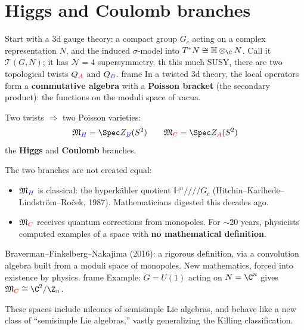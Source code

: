\documentclass[presentation]{beamer}
\newenvironment{block}
\newenvironment{frame}
\theoremstyle{remark}
\begin{document}
\section{Higgs and Coulomb branches}
\begin{frame}
  Start with a 3d gauge theory: a compact group $G_c$ acting on a
  complex representation $N$, and the induced $\sigma$-model into
  $T^*N\cong \mathbb{H}\otimes_{\C} N$.  Call it $\mathcal{T}(G,N)$;
  it has $\mathcal{N}=4$ supersymmetry.
  \begin{block}{}
    With this much SUSY, there are two topological twists
    $Q_{\color{red} A}$ and $Q_{\color{blue} B}$.
  \end{block}
  In a twisted 3d theory, the local operators form a {\bf commutative
    algebra} with a {\bf Poisson bracket} (the secondary product): the
  functions on the moduli space of vacua.
  \bigskip

  Two twists $\Rightarrow$ two Poisson varieties:
  \[\MH=\Spec Z_{\color{blue} B}(S^2) \qquad \MC=\Spec Z_{\color{red}
      A}(S^2)\]
  the {\bf \color{blue} Higgs} and {\bf \color{red} Coulomb} branches.
\end{frame}

\begin{frame}
  The two branches are not created equal:
  \begin{itemize}
  \item $\mathfrak{M}_{\color{blue}H}$ is classical: the hyperk\"ahler quotient
    $\mathbb{H}^n/\!/\!/\!/G_c$ (Hitchin--Karlhede--Lindstr\"om--Ro\v
    cek, 1987).  Mathematicians digested this decades ago.
  \item $\mathfrak{M}_{\color{red}C}$ receives quantum corrections from monopoles.  For
    $\sim$20 years, physicists computed examples of a space with {\bf
      no mathematical definition}.
  \end{itemize}
  \begin{block}{}
    Braverman--Finkelberg--Nakajima (2016): a rigorous definition,
    via a convolution algebra built from a moduli space of monopoles.
    New mathematics, forced into existence by physics.
  \end{block}
  Example: $G=U(1)$ acting on $N=\C^n$ gives
  $\MC\cong\C^2/\Z_n$.\bigskip

  These spaces include nilcones of semisimple Lie algebras, and behave
  like a new class of ``semisimple Lie algebras,'' vastly generalizing
  the Killing classification.
\end{frame}
\end{document}
